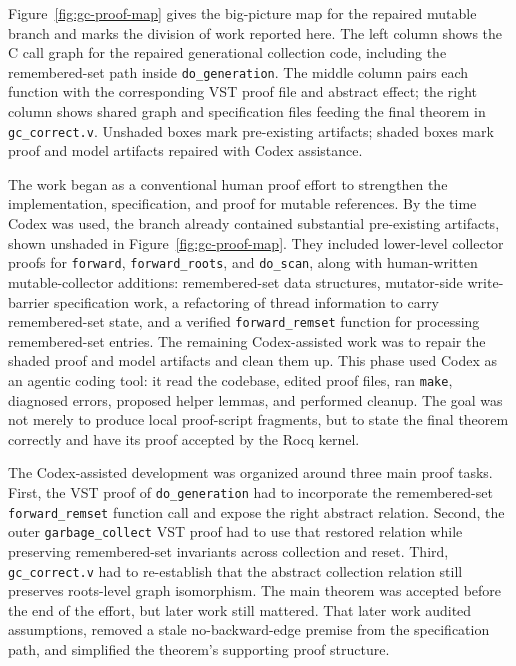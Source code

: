 \documentclass[acmsmall,nonacm]{acmart}
\newcommand{\Rocq}{Rocq}
\newcommand{\VST}{VST}
\begin{document}
Figure~\ref{fig:gc-proof-map} gives the big-picture map for the repaired
mutable branch and marks the division of work reported here.  The left column
shows the C call graph for the repaired generational collection code, including
the remembered-set path inside \texttt{do\_generation}.  The middle column pairs
each function with the corresponding \VST{} proof file and abstract effect; the
right column shows shared graph and specification files feeding the final theorem
in \texttt{gc\_correct.v}.  Unshaded boxes mark pre-existing artifacts; shaded
boxes mark proof and model artifacts repaired with Codex assistance.

The work began as a conventional human proof effort to strengthen the
implementation, specification, and proof for mutable references.  By
the time Codex was used, the branch already contained substantial
pre-existing artifacts, shown unshaded in
Figure~\ref{fig:gc-proof-map}.  They included lower-level collector
proofs for \texttt{forward}, \texttt{forward\_roots}, and
\texttt{do\_scan}, along with human-written mutable-collector
additions: remembered-set data structures, mutator-side write-barrier
specification work, a refactoring of thread information to carry
remembered-set state, and a verified \texttt{forward\_remset} function
for processing remembered-set entries.  The remaining Codex-assisted
work was to repair the shaded proof and model artifacts and clean them
up.  This phase used Codex as an agentic coding tool: it read the
codebase, edited proof files, ran \texttt{make}, diagnosed errors,
proposed helper lemmas, and performed cleanup.  The goal was not
merely to produce local proof-script fragments, but to state the final
theorem correctly and have its proof accepted by the \Rocq{} kernel.

The Codex-assisted development was organized around three main proof
tasks.  First, the \VST{} proof of \texttt{do\_generation} had to
incorporate the remembered-set \texttt{forward\_remset} function call
and expose the right abstract relation.  Second, the outer
\texttt{garbage\_collect} \VST{} proof had to use that restored
relation while preserving remembered-set invariants across collection
and reset.  Third, \texttt{gc\_correct.v} had to re-establish that the
abstract collection relation still preserves roots-level graph
isomorphism.  The main theorem was accepted before the end of the
effort, but later work still mattered.  That later work audited
assumptions, removed a stale no-backward-edge premise from the
specification path, and simplified the theorem's supporting proof
structure.
\end{document}
